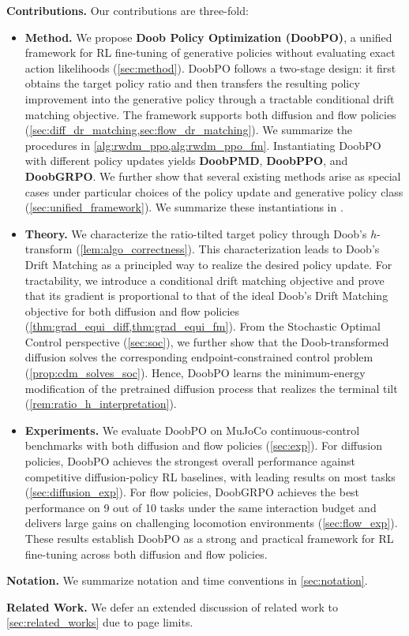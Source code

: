 \textbf{Contributions.}
Our contributions are three-fold:
\begin{itemize}
    \item \textbf{Method.}
    We propose \textbf{Doob Policy Optimization (DoobPO)}, a unified framework for RL fine-tuning of generative policies without evaluating exact action likelihoods
    (\cref{sec:method}).
    DoobPO follows a two-stage design: it first obtains the target policy ratio and then transfers the resulting policy improvement into the generative policy through a tractable conditional drift matching objective.
    The framework supports both diffusion and flow policies
    (\cref{sec:diff_dr_matching,sec:flow_dr_matching}).
    We summarize
    the procedures in
    \cref{alg:rwdm_ppo,alg:rwdm_ppo_fm}.
    Instantiating DoobPO with different policy updates yields
    \textbf{DoobPMD}, \textbf{DoobPPO}, and \textbf{DoobGRPO}.
    We further show that several existing methods arise as special cases under particular choices of the policy update and generative policy class
    (\cref{sec:unified_framework}).
    We summarize these instantiations in .

    \item \textbf{Theory.}
    We characterize the ratio-tilted target policy through Doob's $h$-transform
    (\cref{lem:algo_correctness}).
    This characterization leads to Doob's Drift Matching as a principled way to realize the desired policy update.
    For tractability, we introduce a conditional drift matching objective and prove that its gradient is proportional to that of the ideal Doob's Drift Matching objective for both diffusion and flow policies
    (\cref{thm:grad_equi_diff,thm:grad_equi_fm}).
    From the Stochastic Optimal Control perspective
    (\cref{sec:soc}),
    we further show that the Doob-transformed diffusion solves the corresponding endpoint-constrained control problem
    (\cref{prop:cdm_solves_soc}).
    Hence, DoobPO learns the minimum-energy modification of the pretrained diffusion process that realizes the terminal tilt
    (\cref{rem:ratio_h_interpretation}).

    \item \textbf{Experiments.}
    We evaluate DoobPO on MuJoCo continuous-control benchmarks with both diffusion and flow policies
    (\cref{sec:exp}).
    For diffusion policies, DoobPO achieves the strongest overall performance against competitive diffusion-policy RL baselines, with leading results on most tasks
    (\cref{sec:diffusion_exp}).
    For flow policies, DoobGRPO achieves the best performance on 9 out of 10 tasks under the same interaction budget and delivers large gains on challenging locomotion environments
    (\cref{sec:flow_exp}).
    These results establish DoobPO as a strong and practical framework for RL fine-tuning across both diffusion and flow policies.
\end{itemize}

\textbf{Notation.}
We summarize notation and time conventions in \cref{sec:notation}.

\textbf{Related Work.}
We defer an extended discussion of related work to \cref{sec:related_works} due to page limits.